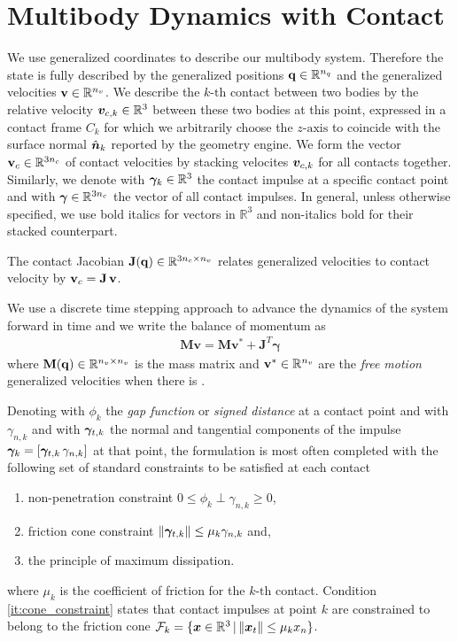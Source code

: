 \section{Multibody Dynamics with Contact}
\label{sec:multibody_dynamics_with_contact}

We use generalized coordinates to describe our multibody system. Therefore the
state is fully described by the generalized positions
${\mathbf{q}}\in\mathbb{R}^{n_q}$ and the generalized velocities
${\mathbf{v}}\in\mathbb{R}^{n_v}$. We describe the $k\text{-th}$ contact between two
bodies by the relative velocity ${\bm{v}}_{c,k}\in\mathbb{R}^3$ between these two
bodies at this point, expressed in a contact frame $C_k$ for which we
arbitrarily choose the $z\text{-axis}$ to coincide with the surface normal
$\hat{{\bm{n}}}_k$ reported by the geometry engine. We form the vector
${\mathbf{v}}_{c}\in\mathbb{R}^{3n_c}$ of contact velocities by stacking velocites
${\bm{v}}_{c,k}$ for all contacts together. Similarly, we denote with
${\bm\gamma}_k\in\mathbb{R}^3$ the contact impulse at a specific contact point and
with ${\bm\gamma}\in\mathbb{R}^{3n_c}$ the vector of all contact impulses. In
general, unless otherwise specified, we use bold italics for vectors in
$\mathbb{R}^3$ and non-italics bold for their stacked counterpart.

The contact Jacobian ${\mathbf{J}}({\mathbf{q}})\in\mathbb{R}^{3n_c\times n_v}$ relates
generalized velocities to contact velocity by ${\mathbf{v}}_c={\mathbf{J}}\,{\mathbf{v}}$.

We use a discrete time stepping approach to advance the dynamics of the system
forward in time and we write the balance of momentum as
\begin{eqnarray}
	\mathbf{M}\mathbf{v} = \mathbf{M}\mathbf{v}^* + \mathbf{J}^T\mathbf{\gamma}
	\label{eq:momentum_balance}
\end{eqnarray}
where ${\mathbf{M}}({\mathbf{q}})\in\mathbb{R}^{n_v\times n_v}$ is the mass matrix and
${\mathbf{v}}^*\in\mathbb{R}^{n_v}$ are the \textit{free motion} generalized
velocities when there is .

Denoting with $\phi_k$ the \textit{gap function} or \textit{signed distance} at
a contact point and with $\gamma_{n,k}$ and with ${\bm\gamma}_{t,k}$ the normal and
tangential components of the impulse ${\bm\gamma}_k=[{\bm\gamma}_{t,k}\,\gamma_{n,k}]$
at that point, the formulation is most often completed with the following set of
standard constraints to be satisfied at each contact
\begin{enumerate}
	\item non-penetration constraint $0\le\phi_k\perp\gamma_{n,k}\ge0$,
	\item\label{it:cone_constraint} friction cone constraint
	$\Vert{\bm\gamma}_{t,k}\Vert\le \mu_k\gamma_{n,k}$ and,
	\item the principle of maximum dissipation.
\end{enumerate}
where $\mu_k$ is the coefficient of friction for the $k\text{-th}$ contact.
Condition \ref{it:cone_constraint} states that contact impulses at point $k$ are
constrained to belong to the friction cone
$\mathcal{F}_k=\{{\bm{x}}\in\mathbb{R}^3 \,|\, \Vert{\bm{x}}_t\Vert\le \mu_k x_n\}$.

